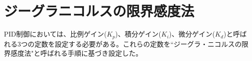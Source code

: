 \documentclass[a4j]{ujarticle}
\begin{document}
%
%
%

\section{ジーグラニコルスの限界感度法}
\label{gigura}
PID制御においては、比例ゲイン($K_p$)、積分ゲイン($K_i$)、微分ゲイン($K_d$)と呼ばれる3つの定数を設定する必要がある。これらの定数を``ジーグラ・ニコルスの限界感度法"と呼ばれる手順に基づき設定した。
\end{document}
